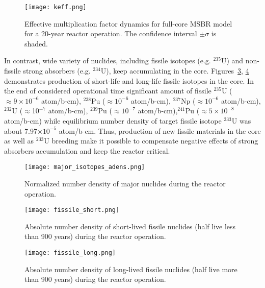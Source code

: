 \begin{figure}[htp!] %
  \centering
  \vspace{-0.3em}
  \texttt{[image: keff.png]}
  \caption{Effective multiplication factor dynamics for full-core \gls{MSBR} model for a 20-year reactor operation. The confidence interval $\pm\sigma$ is shaded.}
  \vspace{-0.6em}
  \label{fig:keff}
\end{figure}

In contrast, wide variety of nuclides, including fissile isotopes (e.g. $^{235}$U) and non-fissile strong absorbers (e.g. $^{234}$U), keep accumulating in the core. Figures~\ref{fig:fissile_short}, \ref{fig:fissile_long} demonstrates production of short-life and long-life fissile isotopes in the core. In the end of considered operational time significant amount of fissile $^{235}$U ($\approx 9\times10^{-6}$ atom/b-cm), $^{238}$Pu ($\approx 10^{-6}$ atom/b-cm), $^{237}$Np ($\approx10^{-6}$ atom/b-cm), $^{232}$U ($\approx$10$^{-7}$ atom/b-cm), $^{239}$Pu ($\approx10^{-7}$ atom/b-cm),$^{241}$Pu ($\approx 5\times10^{-8}$ atom/b-cm) while equilibrium number density of target fissile isotope $^{233}$U was about 7.97$\times10^{-5}$ atom/b-cm. Thus, production of new fissile materials in the core as well as $^{233}$U breeding make it possible to compensate negative effects of strong absorbers accumulation and keep the reactor critical.

\begin{figure}[htp!] %
  \centering
  \vspace{-0.3em}
  \texttt{[image: major\_isotopes\_adens.png]}
  \caption{Normalized number density of major nuclides during the reactor operation.}
  \vspace{-0.6em}
  \label{fig:adens_eq}
\end{figure}
\FloatBarrier

\begin{figure}[htp!] %
  \centering
  \vspace{-0.3em}
  \texttt{[image: fissile\_short.png]}
  \caption{Absolute number density of short-lived fissile nuclides (half live less than 900 years) during the reactor operation.}
  \vspace{-0.6em}
  \label{fig:fissile_short}
\end{figure}

\begin{figure}[hbp!] %
  \centering
  \vspace{-0.3em}
  \texttt{[image: fissile\_long.png]}
  \caption{Absolute number density of long-lived fissile nuclides (half live more than 900 years) during the reactor operation.}
  \vspace{-0.6em}
  \label{fig:fissile_long}
\end{figure}
\FloatBarrier

